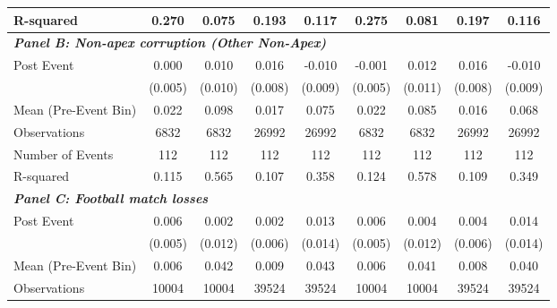 {\begin{tabular}{l*{8}{c}}
R-squared   &       0.270         &       0.075         &       0.193         &       0.117         &       0.275         &       0.081         &       0.197         &       0.116         \\
\midrule
\multicolumn{9}{l}{\textbf{\textit{Panel B: Non-apex corruption (Other Non-Apex)}}} \\
Post Event  &       0.000         &       0.010         &       0.016\sym{**} &      -0.010         &      -0.001         &       0.012         &       0.016\sym{**} &      -0.010         \\
&     (0.005)         &     (0.010)         &     (0.008)         &     (0.009)         &     (0.005)         &     (0.011)         &     (0.008)         &     (0.009)         \\
\midrule
Mean (Pre-Event Bin)&       0.022         &       0.098         &       0.017         &       0.075         &       0.022         &       0.085         &       0.016         &       0.068         \\
Observations&        6832         &        6832         &       26992         &       26992         &        6832         &        6832         &       26992         &       26992         \\
Number of Events&         112         &         112         &         112         &         112         &         112         &         112         &         112         &         112         \\
R-squared   &       0.115         &       0.565         &       0.107         &       0.358         &       0.124         &       0.578         &       0.109         &       0.349         \\
\bottomrule
\multicolumn{9}{l}{\textbf{\textit{Panel C: Football match losses}}} \\
Post Event  &       0.006         &       0.002         &       0.002         &       0.013         &       0.006         &       0.004         &       0.004         &       0.014         \\
&     (0.005)         &     (0.012)         &     (0.006)         &     (0.014)         &     (0.005)         &     (0.012)         &     (0.006)         &     (0.014)         \\
\midrule
Mean (Pre-Event Bin)&       0.006         &       0.042         &       0.009         &       0.043         &       0.006         &       0.041         &       0.008         &       0.040         \\
Observations&       10004         &       10004         &       39524         &       39524         &       10004         &       10004         &       39524         &       39524         \\

\end{tabular}}
